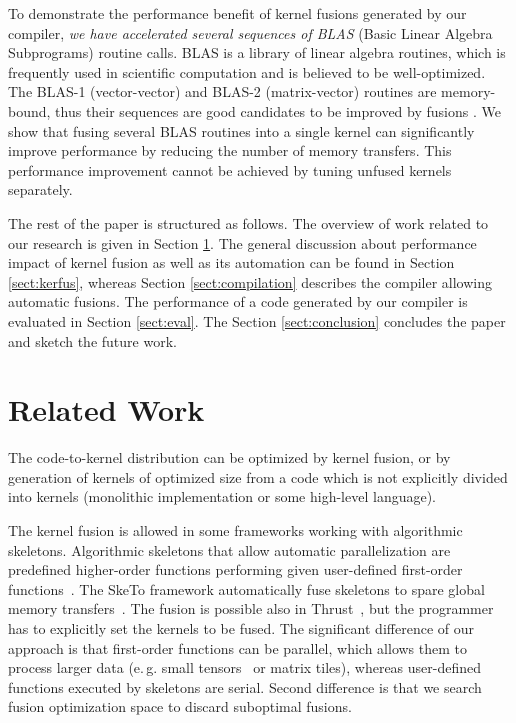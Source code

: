 \documentclass[final]{siamltex}
\def\eg{e.\,g.}
\begin{document}
To demonstrate the performance benefit of kernel fusions generated by our compiler, \textit{we have accelerated several sequences of BLAS} (Basic Linear Algebra Subprograms) routine calls. BLAS is a library of linear algebra routines, which is frequently used in scientific computation and is believed to be well-optimized. The BLAS-1 (vector-vector) and BLAS-2 (matrix-vector) routines are memory-bound, thus their sequences are good candidates to be improved by fusions \cite{belter2009automating, howell2008cache}. We show that fusing several BLAS routines into a single kernel can significantly improve performance by reducing the number of memory transfers. This performance improvement cannot be achieved by tuning unfused kernels separately. 




The rest of the paper is structured as follows. The overview of work related to our research is given in Section \ref{sect:related}. The general discussion about performance impact of kernel fusion as well as its automation can be found in Section \ref{sect:kerfus}, whereas Section \ref{sect:compilation} describes the compiler allowing automatic fusions. The performance of a code generated by our compiler is evaluated in Section \ref{sect:eval}. The Section \ref{sect:conclusion} concludes the paper and sketch the future work.

\section{Related Work}
\label{sect:related}



The code-to-kernel distribution can be optimized by kernel fusion, or by generation of kernels of optimized size from a code which is not explicitly divided into kernels (monolithic implementation or some high-level language).

The kernel fusion is allowed in some frameworks working with algorithmic skeletons. Algorithmic skeletons that allow automatic parallelization are predefined higher-order functions performing given user-defined first-order functions~\cite{cole1989algorithmic, velez2010survey}. The SkeTo framework automatically fuse skeletons to spare global memory transfers~\cite{sato2009skeletal}. The fusion is possible also in Thrust~\cite{hoberock2009thrust}, but the programmer has to explicitly set the kernels to be fused. The significant difference of our approach is that first-order functions can be parallel, which allows them to process larger data (\eg{} small tensors~\cite{filipovic2012automatically} or matrix tiles), whereas user-defined functions executed by skeletons are serial. Second difference is that we search fusion optimization space to discard suboptimal fusions.
\end{document}
